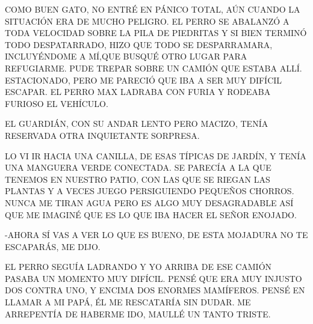 COMO BUEN GATO, NO ENTRÉ EN PÁNICO TOTAL, AÚN CUANDO LA SITUACIÓN ERA DE MUCHO PELIGRO. EL PERRO SE ABALANZÓ A TODA VELOCIDAD SOBRE LA PILA DE PIEDRITAS Y SI BIEN TERMINÓ TODO DESPATARRADO, HIZO QUE TODO SE DESPARRAMARA, INCLUYÉNDOME A MÍ,QUE BUSQUÉ OTRO LUGAR PARA REFUGIARME. PUDE TREPAR SOBRE UN CAMIÓN QUE ESTABA ALLÍ. ESTACIONADO, PERO ME PARECIÓ QUE IBA A SER MUY DIFÍCIL ESCAPAR. EL PERRO MAX LADRABA CON FURIA Y RODEABA FURIOSO EL VEHÍCULO.

EL GUARDIÁN, CON SU ANDAR LENTO PERO MACIZO, TENÍA RESERVADA OTRA INQUIETANTE SORPRESA.





\newpage
{}
LO VI IR HACIA UNA CANILLA, DE ESAS TÍPICAS DE JARDÍN, Y TENÍA UNA MANGUERA VERDE CONECTADA. SE PARECÍA A LA QUE TENEMOS EN NUESTRO PATIO, CON LAS QUE SE RIEGAN LAS PLANTAS Y A VECES JUEGO PERSIGUIENDO PEQUEÑOS CHORROS. NUNCA ME TIRAN AGUA PERO ES ALGO MUY DESAGRADABLE ASÍ QUE ME IMAGINÉ QUE ES LO QUE IBA HACER EL SEÑOR ENOJADO.

-AHORA SÍ VAS A VER LO QUE ES BUENO, DE ESTA MOJADURA NO TE ESCAPARÁS, ME DIJO.

EL PERRO SEGUÍA LADRANDO Y YO ARRIBA DE ESE CAMIÓN PASABA UN MOMENTO MUY DIFÍCIL. PENSÉ QUE ERA MUY INJUSTO DOS CONTRA UNO, Y ENCIMA DOS ENORMES MAMÍFEROS. PENSÉ EN LLAMAR A MI PAPÁ, ÉL ME RESCATARÍA SIN DUDAR. ME ARREPENTÍA DE HABERME IDO, MAULLÉ UN TANTO TRISTE.



